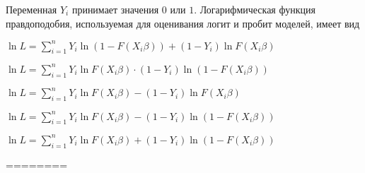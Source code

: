 
\begin{question}
Переменная \(Y_i\) принимает значения \(0\) или \(1\). Логарифмическая
функция правдоподобия, используемая для оценивания логит и пробит
моделей, имеет вид
\begin{answerlist}
  \item \(\ln L = \sum_{i=1}^n Y_i \ln (1 - F(X_i \beta)) + (1 - Y_i) \ln F(X_i \beta)\)
  \item \(\ln L = \sum_{i=1}^n Y_i \ln F(X_i \beta) \cdot (1 - Y_i) \ln (1 - F(X_i \beta))\)
  \item \(\ln L = \sum_{i=1}^n Y_i \ln F(X_i \beta) - (1 - Y_i) \ln F(X_i \beta)\)
  \item \(\ln L = \sum_{i=1}^n Y_i \ln F(X_i \beta) - (1 - Y_i) \ln (1 - F(X_i \beta))\)
  \item \(\ln L = \sum_{i=1}^n Y_i \ln F(X_i \beta) + (1 - Y_i) \ln (1 - F(X_i \beta))\)
\end{answerlist}
\end{question}

\begin{solution}
========
\end{solution}

